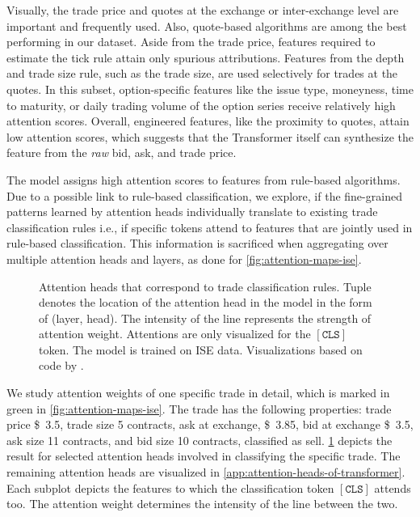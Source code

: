 Visually, the trade price and quotes at the exchange or inter-exchange level are important and frequently used. Also, quote-based algorithms are among the best performing in our dataset. Aside from the trade price, features required to estimate the tick rule attain only spurious attributions. Features from the depth and trade size rule, such as the trade size, are used selectively for trades at the quotes. In this subset, option-specific features like the issue type, moneyness, time to maturity, or daily trading volume of the option series receive relatively high attention scores.  Overall, engineered features, like the proximity to quotes, attain low attention scores, which suggests that the Transformer itself can synthesize the feature from the \emph{raw} bid, ask, and trade price.

The model assigns high attention scores to features from rule-based algorithms. Due to a possible link to rule-based classification, we explore, if the fine-grained patterns learned by attention heads individually translate to existing trade classification rules i.e., if specific tokens attend to features that are jointly used in rule-based classification. This information is sacrificed when aggregating over multiple attention heads and layers, as done for \cref{fig:attention-maps-ise}.

\begin{figure}[h!]
    \hfill
    \hfill
    \caption[Rule-like Roles of Selected Attention Heads]{Attention heads that correspond to trade classification rules. Tuple denotes the location of the attention head in the model in the form of (layer, head). The intensity of the line represents the strength of attention weight. Attentions are only visualized for the $\mathtt{[CLS]}$ token. The model is trained on \gls{ISE} data. Visualizations based on code by \textcite[][279]{clarkWhatDoesBERT2019}.}
    \label{fig:rule-like-attention-heads}
\end{figure}

We study attention weights of one specific trade in detail, which is marked in green in \cref{fig:attention-maps-ise}. The trade has the following properties: trade price \SI{3.5}[\$]{}, trade size \SI{5}[]{} contracts, ask at exchange, \SI{3.85}[\$]{}, bid at exchange \SI{3.5}[\$]{}, ask size \SI{11}[]{} contracts, and bid size \SI{10}[]{} contracts, classified as sell. \cref{fig:rule-like-attention-heads} depicts the result for selected attention heads involved in classifying the specific trade. The remaining attention heads are visualized in \cref{app:attention-heads-of-transformer}. Each subplot depicts the features to which the classification token $\mathtt{[CLS]}$ attends too. The attention weight determines the intensity of the line between the two. 

